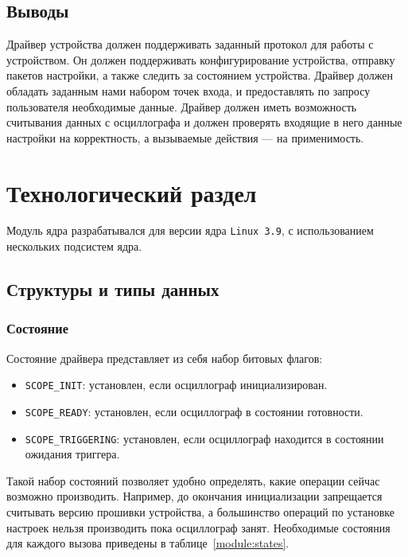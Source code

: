 \documentclass[a4paper,12pt]{report}
\numberwithin{equation}{section}
\begin{document}
\subsection{Выводы}
Драйвер устройства должен поддерживать заданный протокол для работы с
устройством. Он должен поддерживать конфигурирование устройства, отправку
пакетов настройки, а также следить за состоянием устройства. Драйвер должен
обладать заданным нами набором точек входа, и предоставлять по запросу
пользователя необходимые данные. Драйвер должен иметь возможность считывания
данных с осциллографа и должен проверять входящие в него данные настройки на
корректность, а вызываемые действия --- на применимость.

\newpage
\section{Технологический раздел}
Модуль ядра разрабатывался для версии ядра \texttt{Linux 3.9}, с использованием
нескольких подсистем ядра.

\subsection{Структуры и типы данных}
\subsubsection{Состояние}
Состояние драйвера представляет из себя набор битовых флагов:
\begin{itemize}
\item \texttt{SCOPE\_INIT}: установлен, если осциллограф инициализирован.
\item \texttt{SCOPE\_READY}: установлен, если осциллограф в состоянии готовности.
\item \texttt{SCOPE\_TRIGGERING}: установлен, если осциллограф находится в
  состоянии ожидания триггера.
\end{itemize}
Такой набор состояний позволяет удобно определять, какие операции сейчас
возможно производить. Например, до окончания инициализации запрещается считывать
версию прошивки устройства, а большинство операций по установке настроек нельзя
производить пока осциллограф занят. Необходимые состояния для каждого вызова
приведены в таблице~\ref{module:states}.
\end{document}
